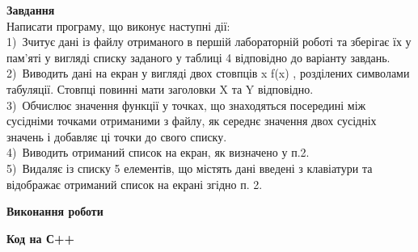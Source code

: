 \documentclass[a4paper,14pt]{extreport}
\begin{document}
\textbf{Завдання}\\
Написати програму, що виконує наступні дії:\\

1) Зчитує дані із файлу отриманого в першій лабораторній роботі та зберігає їх у пам’яті у вигляді списку заданого у таблиці 4 відповідно до варіанту завдань.\\

2) Виводить дані на екран у вигляді двох стовпців x f(x) , розділених символами табуляції. Стовпці повинні мати заголовки X та Y відповідно.\\

3) Обчислює значення функції у точках, що знаходяться посередині між сусідніми точками отриманими з файлу, як середнє значення двох сусідніх значень і добавляє ці точки до свого списку.\\

4) Виводить отриманий список на екран, як визначено у п.2.\\

5) Видаляє із списку 5 елементів, що містять дані введені з клавіатури та відображає отриманий список на екрані згідно п. 2.\\



\vspace{0.3cm}
\begin{center}\textbf{Виконання роботи}\end{center}
\textbf{Код на С++}\\


\end{document}
